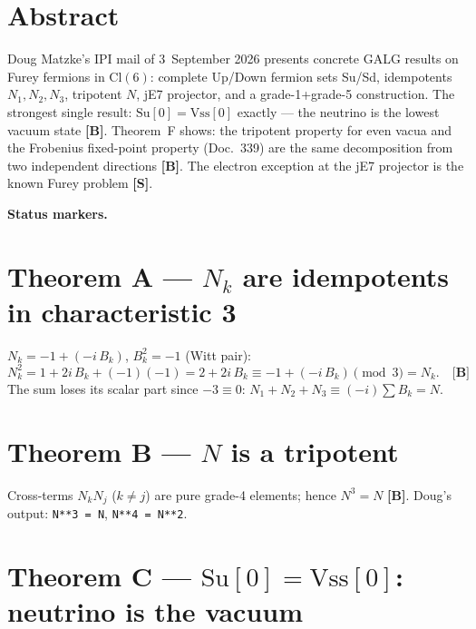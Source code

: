 
\providecommand{\BM}{\textbf{[B]}}
\providecommand{\KM}{\textbf{[K]}}
\providecommand{\SM}{\textbf{[S]}}

{}

\section*{Abstract}

Doug Matzke's IPI mail of 3~September 2026 presents concrete GALG results on Furey fermions
in Cl$(6)$: complete Up/Down fermion sets Su/Sd, idempotents $N_1,N_2,N_3$, tripotent $N$,
jE7 projector, and a grade-1+grade-5 construction. The strongest single result:
$\mathrm{Su}[0] = \mathrm{Vss}[0]$ exactly --- the neutrino is the lowest vacuum state \BM.
Theorem~F shows: the tripotent property for even vacua and the Frobenius fixed-point property
(Doc.~339) are the same decomposition from two independent directions \BM.
The electron exception at the jE7 projector is the known Furey problem \SM.

\medskip\noindent\textbf{Status markers.}


\section{Theorem A --- $N_k$ are idempotents in characteristic 3}

$N_k = -1 + (-i\,B_k)$, $B_k^2 = -1$ (Witt pair):
\[
N_k^2 = 1 + 2i\,B_k + (-1)(-1) = 2 + 2i\,B_k \equiv -1 + (-i\,B_k) \pmod{3} = N_k. \quad \BM
\]
The sum loses its scalar part since $-3\equiv0$: $N_1+N_2+N_3 \equiv (-i)\sum B_k = N$.

\section{Theorem B --- $N$ is a tripotent}

Cross-terms $N_kN_j$ ($k\neq j$) are pure grade-4 elements; hence $N^3=N$ \BM.
Doug's output: \texttt{N**3 = N}, \texttt{N**4 = N**2}.

\section{Theorem C --- $\mathrm{Su}[0] = \mathrm{Vss}[0]$: neutrino is the vacuum}


